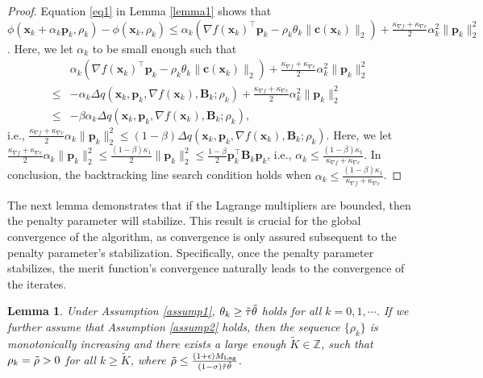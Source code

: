 \documentclass[aos]{imsart}
\numberwithin{equation}{section}
\theoremstyle{plain}
\newtheorem{lemma}{Lemma}
\begin{document}
\begin{appendix}
 \begin{proof}
     Equation \eqref{eq1} in Lemma \ref{lemma1} shows that $\phi(\bm{x}_k+\alpha_k \bm{p}_k,\rho_k) - \phi(\bm{x}_k,\rho_k) \leq \alpha_k \left(\nabla f(\bm{x}_k)^{\top} \bm{p}_k - \rho_k \theta_k \|\bm{c}(\bm{x}_k)\|_2 \right) + \frac{\kappa_{\nabla f}+\kappa_{\nabla c}}{2} \alpha_k^2 \|\bm{p}_k\|_2^2$. Here, we let $\alpha_k$ to be small enough such that  
     \begin{equation*}
         \begin{split}
             &\alpha_k \left(\nabla f(\bm{x}_k)^{\top} \bm{p}_k - \rho_k \theta_k \|\bm{c}(\bm{x}_k)\|_2 \right) + \frac{\kappa_{\nabla f}+\kappa_{\nabla c}}{2} \alpha_k^2 \|\bm{p}_k\|_2^2\\
             \leq &  -\alpha_k \Delta q(\bm{x}_k,\bm{p}_k,\nabla f(\bm{x}_k),\bm{B}_k;\rho_k) + \frac{\kappa_{\nabla f}+\kappa_{\nabla c}}{2} \alpha_k^2 \|\bm{p}_k\|_2^2\\
             \leq & -\beta \alpha_k \Delta q(\bm{x}_k,\bm{p}_k,\nabla f(\bm{x}_k),\bm{B}_k;\rho_k),
         \end{split}
     \end{equation*}
     i.e., $\frac{\kappa_{\nabla f}+\kappa_{\nabla c}}{2} \alpha_k \|\bm{p}_k\|_2^2 \leq (1-\beta)\Delta q(\bm{x}_k,\bm{p}_k,\nabla f(\bm{x}_k),\bm{B}_k;\rho_k)$. Here, we let $\frac{\kappa_{\nabla f}+\kappa_{\nabla c}}{2} \alpha_k \|\bm{p}_k\|_2^2 \leq \frac{(1-\beta) \kappa_1}{2} \|\bm{p}_k\|_2^2 \leq \frac{1-\beta}{2}\bm{p}_k^{\top} \bm{B}_k \bm{p}_k$, i.e., $\alpha_k \leq \frac{(1-\beta)\kappa_1}{\kappa_{\nabla f}+\kappa_{\nabla c}}$. In conclusion, the backtracking line search condition holds when  $\alpha_k \leq \frac{(1-\beta)\kappa_1}{\kappa_{\nabla f}+\kappa_{\nabla c}}$.
 \end{proof}


The next lemma demonstrates that if the Lagrange multipliers are bounded, then the penalty parameter will stabilize. This result is crucial for the global convergence of the algorithm, as convergence is only assured subsequent to the penalty parameter's stabilization. Specifically, once the penalty parameter stabilizes, the merit function's convergence naturally leads to the convergence of the iterates.
\begin{lemma}
  \label{lemma3}
     Under Assumption \ref{assump1}, $\theta_k \geq \Tilde{\tau} \Tilde{\theta}$ holds for all $k=0,1, \cdots$. If we further assume that Assumption \ref{assump2} holds, then the sequence $\{\rho_k\}$ is monotonically increasing and there exists a large enough $\widetilde{K} \in \mathbb{Z}$, such that $\rho_k = \Tilde{\rho} > 0$ for all $k 
     \geq \widetilde{K}$, where $\Tilde{\rho} \leq \frac{(1+\epsilon)M_{\text{Lag}}}{(1-\sigma)\Tilde{\tau} \Tilde{\theta}}$.   
 \end{lemma}


\end{appendix}
\end{document}
